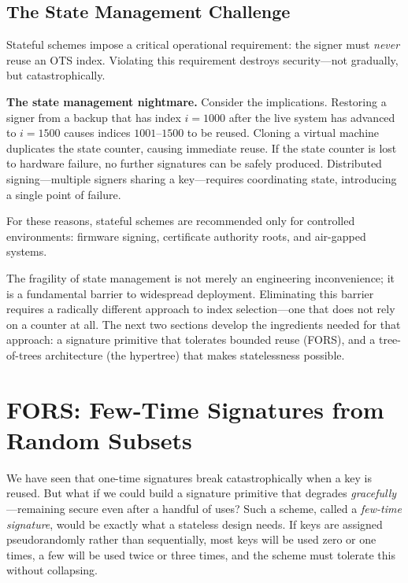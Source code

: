 \subsection{The State Management Challenge}
\label{subsec:state-management}

Stateful schemes impose a critical operational requirement: the signer must \emph{never} reuse an OTS index.  Violating this requirement destroys security---not gradually, but catastrophically.

\begin{svgraybox}
\textbf{The state management nightmare.}  Consider the implications.  Restoring a signer from a backup that has index $i=1000$ after the live system has advanced to $i=1500$ causes indices $1001$--$1500$ to be reused.  Cloning a virtual machine duplicates the state counter, causing immediate reuse.  If the state counter is lost to hardware failure, no further signatures can be safely produced.  Distributed signing---multiple signers sharing a key---requires coordinating state, introducing a single point of failure.

For these reasons, stateful schemes are recommended only for controlled environments: firmware signing, certificate authority roots, and air-gapped systems.
\end{svgraybox}

The fragility of state management is not merely an engineering inconvenience; it is a fundamental barrier to widespread deployment.  Eliminating this barrier requires a radically different approach to index selection---one that does not rely on a counter at all.  The next two sections develop the ingredients needed for that approach: a signature primitive that tolerates bounded reuse (FORS), and a tree-of-trees architecture (the hypertree) that makes statelessness possible.


\section{FORS: Few-Time Signatures from Random Subsets}
\label{sec:fors}

We have seen that one-time signatures break catastrophically when a key is reused.  But what if we could build a signature primitive that degrades \emph{gracefully}---remaining secure even after a handful of uses?  Such a scheme, called a \emph{few-time signature}, would be exactly what a stateless design needs.  If keys are assigned pseudorandomly rather than sequentially, most keys will be used zero or one times, a few will be used twice or three times, and the scheme must tolerate this without collapsing.

